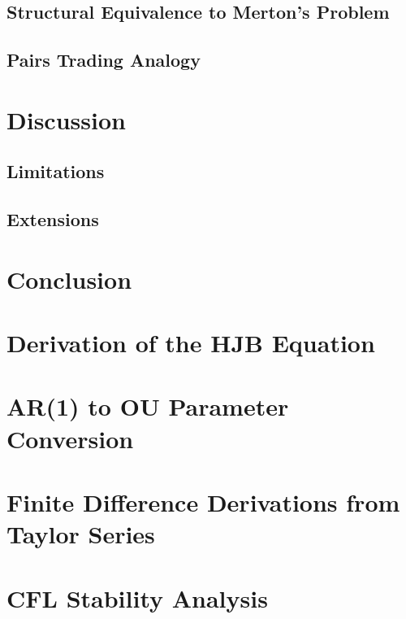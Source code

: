 \documentclass[11pt]{article}
\theoremstyle{plain}
\theoremstyle{definition}
\theoremstyle{remark}
\begin{document}
\subsection{Structural Equivalence to Merton's Problem}
\label{sec:merton}

\subsection{Pairs Trading Analogy}
\label{sec:pairs}

\section{Discussion}
\label{sec:discussion}

\subsection{Limitations}
\label{sec:limitations}

\subsection{Extensions}
\label{sec:extensions}

\section{Conclusion}
\label{sec:conclusion}

\appendix

\section{Derivation of the HJB Equation}
\label{app:hjb}

\section{AR(1) to OU Parameter Conversion}
\label{app:ou}

\section{Finite Difference Derivations from Taylor Series}
\label{app:fd}

\section{CFL Stability Analysis}
\label{app:cfl}



\end{document}
